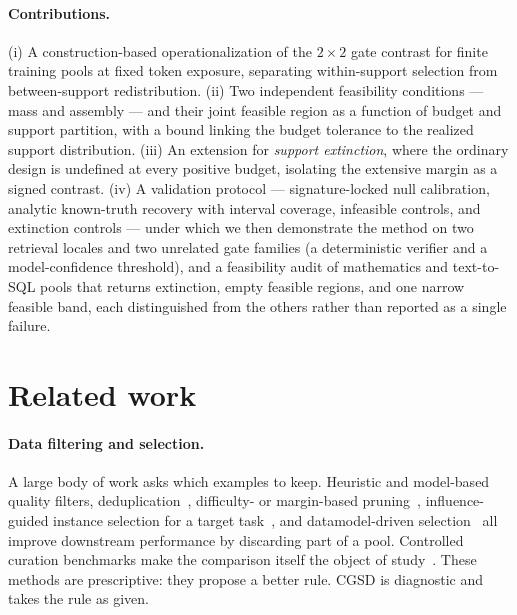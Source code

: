 \documentclass[10pt,twocolumn]{article}
\begin{document}
\paragraph{Contributions.}
(i) A construction-based operationalization of the $2\times2$ gate contrast for finite training
pools at fixed token exposure, separating within-support selection from between-support
redistribution. (ii) Two independent feasibility conditions --- mass and assembly --- and their
joint feasible region as a function of budget and support partition, with a bound linking the
budget tolerance to the realized support distribution. (iii) An extension for \emph{support
extinction}, where the ordinary design is undefined at every positive budget, isolating the
extensive margin as a signed contrast. (iv) A validation protocol --- signature-locked null
calibration, analytic known-truth recovery with interval coverage, infeasible controls, and
extinction controls --- under which we then demonstrate the method on two retrieval locales and
two unrelated gate families (a deterministic verifier and a model-confidence threshold), and
a feasibility audit of mathematics and text-to-SQL pools that returns extinction, empty feasible
regions, and one narrow feasible band, each distinguished from the others rather than reported
as a single failure.

\section{Related work}

\paragraph{Data filtering and selection.}
A large body of work asks which examples to keep. Heuristic and model-based quality filters,
deduplication~\citep{lee2022deduplicating,abbas2023semdedup}, difficulty- or margin-based
pruning~\citep{sorscher2022beyond}, influence-guided instance selection for a target
task~\citep{xia2024less}, and datamodel-driven selection~\citep{engstrom2024dsdm} all improve
downstream performance by discarding part of a pool. Controlled curation benchmarks make the
comparison itself the object of study~\citep{gadre2023datacomp}. These methods are prescriptive:
they propose a better rule. CGSD is diagnostic and takes the rule as given.
\end{document}
